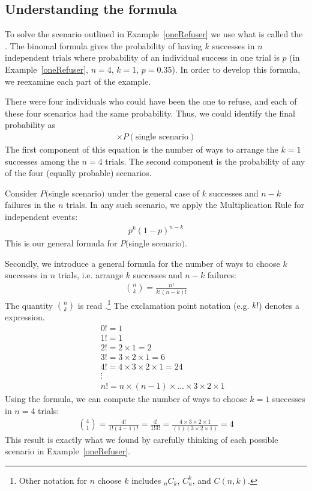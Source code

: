 \subsection{Understanding the formula}
To solve the scenario outlined in Example~\ref{oneRefuser} we use what is called the .  The binomal formula gives the probability of having $k$ successes in $n$ independent trials where probability of an individual success in one trial is $p$ (in Example~\ref{oneRefuser}, $n=4$, $k=1$, $p=0.35$). In order to develop this formula, we reexamine each part of the example.

There were four individuals who could have been the one to refuse, and each of these four scenarios had the same probability. Thus, we could identify the final probability as
\begin{eqnarray}
[\text{\# of scenarios}] \times P(\text{single scenario})
\label{genBinomialFormula}
\end{eqnarray}
The first component of this equation is the number of ways to arrange the $k=1$ successes among the $n=4$ trials. The second component is the probability of any of the four (equally probable) scenarios.

Consider $P($single scenario$)$ under the general case of $k$ successes and $n-k$ failures in the $n$ trials. In any such scenario, we apply the Multiplication Rule for independent events:
\begin{eqnarray*}
p^k(1-p)^{n-k}
\end{eqnarray*}
This is our general formula for $P($single scenario$)$.

Secondly, we introduce a general formula for the number of ways to choose $k$ successes in $n$ trials, i.e. arrange $k$ successes and $n-k$ failures:
\begin{eqnarray*}
{n\choose k} = \frac{n!}{k!(n-k)!}
\end{eqnarray*}
The quantity ${n\choose k}$ is read .\footnote{Other notation for $n$ choose $k$ includes $_nC_k$, $C_n^k$, and $C(n,k)$.} The exclamation point notation (e.g. $k!$) denotes a \label{factorialDefinitionInTheBinomialSection} expression.
\begin{eqnarray*}
&& 0! = 1 \label{zeroFactorial} \\
&& 1! = 1 \\
&& 2! = 2\times1 = 2 \\
&& 3! = 3\times2\times1 = 6 \\
&& 4! = 4\times3\times2\times1 = 24 \\
&& \vdots \\
&& n! = n\times(n-1)\times...\times3\times2\times1
\end{eqnarray*}
Using the formula, we can compute the number of ways to choose $k=1$ successes in $n=4$ trials:
\begin{eqnarray*}
{4 \choose 1} = \frac{4!}{1!(4-1)!} =  \frac{4!}{1!3!} 
	= \frac{4\times3\times2\times1}{(1)(3\times2\times1)} = 4
\end{eqnarray*}
This result is exactly what we found by carefully thinking of each possible scenario in Example~\ref{oneRefuser}.

